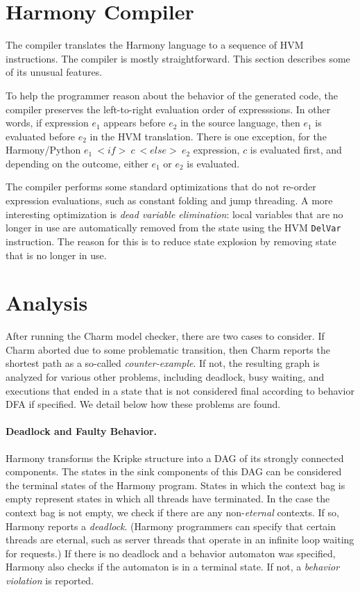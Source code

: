\documentclass[twocolumn]{article}
\begin{document}
\section{Harmony Compiler}

The compiler translates the Harmony language to a sequence of HVM
instructions.  The compiler is mostly straightforward.  This section
describes some of its unusual features.

To help the programmer reason about the behavior of the generated code,
the compiler preserves the left-to-right evaluation order of
expresssions.  In other words, if expression $e_1$ appears before
$e_2$ in the source language, then $e_1$ is evaluated before $e_2$
in the HVM translation.  There is one exception, for the Harmony/Python
$e_1~<{if}>~c~<{else}>~e_2$ expression, $c$ is evaluated first, and
depending on the outcome, either $e_1$ or $e_2$ is evaluated.

The compiler performs some standard optimizations that do not re-order
expression evaluations, such as constant folding and jump threading.
A more interesting optimization is \emph{dead variable elimination}:
local variables that are no longer in use are automatically removed
from the state using the HVM \texttt{DelVar} instruction.  The reason
for this is to reduce state explosion by removing state that is no
longer in use.

\section{Analysis}

After running the Charm model checker, there are two cases to
consider.  If Charm aborted due to some problematic transition,
then Charm reports the shortest path as a so-called \emph{counter-example}.
If not, the resulting graph is analyzed for various other problems,
including deadlock, busy waiting, and executions
that ended in a state that is not considered final according to
behavior DFA if specified.  We detail below how these problems are
found.

\paragraph{Deadlock and Faulty Behavior.}

Harmony transforms the Kripke structure into a DAG of its strongly
connected components.  The states in the sink components of this
DAG can be considered the terminal states of the Harmony program.
States in which the context bag is empty represent states in which
all threads have terminated.  In the case the context bag is not
empty, we check if there are any non-\emph{eternal} contexts.  If
so, Harmony reports a \emph{deadlock}.  (Harmony programmers can
specify that certain threads are eternal, such as server threads
that operate in an infinite loop waiting for requests.) If there
is no deadlock and a behavior automaton was specified, Harmony also
checks if the automaton is in a terminal state.  If not, a
\emph{behavior violation} is reported.
\end{document}
